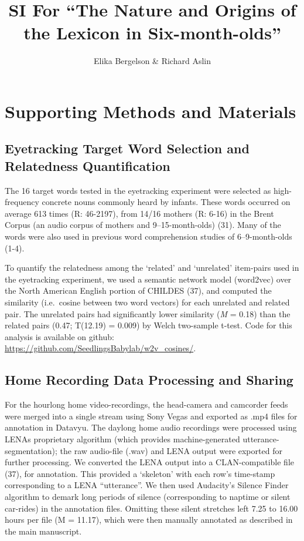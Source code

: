 \documentclass[]{article}
\title{SI For ``The Nature and Origins of the Lexicon in Six-month-olds''}
\author{Elika Bergelson \& Richard Aslin}
\date{}
\begin{document}
\maketitle

\section{Supporting Methods and
Materials}\label{supporting-methods-and-materials}

\subsection{Eyetracking Target Word Selection and Relatedness
Quantification}\label{eyetracking-target-word-selection-and-relatedness-quantification}

The 16 target words tested in the eyetracking experiment were selected
as high-frequency concrete nouns commonly heard by infants. These words
occurred on average 613 times (R: 46-2197), from 14/16 mothers (R: 6-16)
in the Brent Corpus (an audio corpus of mothers and 9--15-month-olds)
(31). Many of the words were also used in previous word comprehension
studies of 6--9-month-olds (1-4).

To quantify the relatedness among the `related' and `unrelated'
item-pairs used in the eyetracking experiment, we used a semantic
network model (word2vec) over the North American English portion of
CHILDES (37), and computed the similarity (i.e.~cosine between two word
vectors) for each unrelated and related pair. The unrelated pairs had
significantly lower similarity (\emph{M} = 0.18) than the related pairs
(0.47; T(12.19) = 0.009) by Welch two-sample t-test. Code for this
analysis is available on github:
\url{https://github.com/SeedlingsBabylab/w2v_cosines/}.

\subsection{Home Recording Data Processing and
Sharing}\label{home-recording-data-processing-and-sharing}

For the hourlong home video-recordings, the head-camera and camcorder
feeds were merged into a single stream using Sony Vegas and exported as
.mp4 files for annotation in Datavyu. The daylong home audio recordings
were processed using LENAs proprietary algorithm (which provides
machine-generated utterance-segmentation); the raw audio-file (.wav) and
LENA output were exported for further processing. We converted the LENA
output into a CLAN-compatible file (37), for annotation. This provided a
`skeleton' with each row's time-stamp corresponding to a LENA
``utterance''. We then used Audacity's Silence Finder algorithm to
demark long periods of silence (corresponding to naptime or silent
car-rides) in the annotation files. Omitting these silent stretches left
7.25 to 16.00 hours per file (M = 11.17), which were then manually
annotated as described in the main manuscript.
\end{document}
